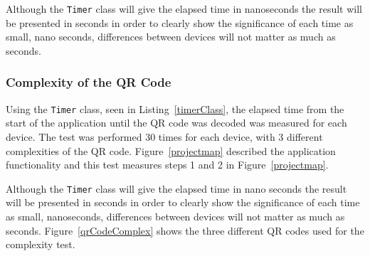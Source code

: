 Although the \texttt{Timer} class will give the elapsed time in nanoseconds the result will be presented in seconds in order to clearly show the significance of each time as small, nano seconds, differences between devices will not matter as much as seconds.

%       
%		

\subsubsection{Complexity of the QR Code}

Using the \texttt{Timer} class, seen in Listing~\ref{timerClass}, the elapsed time from the start of the application until the QR code was decoded was measured for each device. The test was performed 30 times for each device, with 3 different complexities of the QR code. Figure~\ref{projectmap} described the application functionality and this test measures steps 1 and 2 in Figure~\ref{projectmap}.

Although the \texttt{Timer} class will give the elapsed time in nano seconds the result will be presented in seconds in order to clearly show the significance of each time as small, nanoseconds, differences between devices will not matter as much as seconds. Figure~\ref{qrCodeComplex} shows the three different QR codes used for the complexity test.

